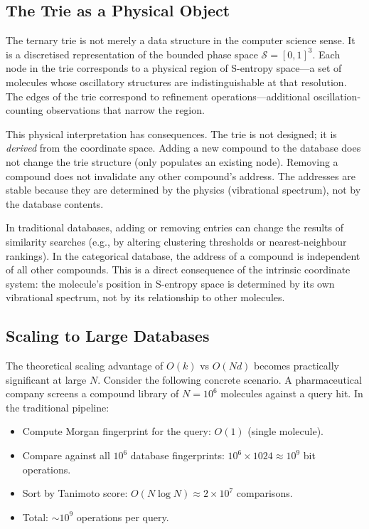 \documentclass[11pt,a4paper]{article}
\theoremstyle{definition}
\theoremstyle{remark}
\newcommand{\Sspace}{\mathcal{S}}
\begin{document}
\subsection{The Trie as a Physical Object}

The ternary trie is not merely a data structure in the computer science sense. It is a discretised representation of the bounded phase space $\Sspace = [0,1]^3$. Each node in the trie corresponds to a physical region of S-entropy space---a set of molecules whose oscillatory structures are indistinguishable at that resolution. The edges of the trie correspond to refinement operations---additional oscillation-counting observations that narrow the region.

This physical interpretation has consequences. The trie is not designed; it is \emph{derived} from the coordinate space. Adding a new compound to the database does not change the trie structure (only populates an existing node). Removing a compound does not invalidate any other compound's address. The addresses are stable because they are determined by the physics (vibrational spectrum), not by the database contents.

In traditional databases, adding or removing entries can change the results of similarity searches (e.g., by altering clustering thresholds or nearest-neighbour rankings). In the categorical database, the address of a compound is independent of all other compounds. This is a direct consequence of the intrinsic coordinate system: the molecule's position in S-entropy space is determined by its own vibrational spectrum, not by its relationship to other molecules.

\subsection{Scaling to Large Databases}

The theoretical scaling advantage of $O(k)$ vs $O(Nd)$ becomes practically significant at large $N$. Consider the following concrete scenario. A pharmaceutical company screens a compound library of $N = 10^6$ molecules against a query hit. In the traditional pipeline:

\begin{itemize}[nosep]
\item Compute Morgan fingerprint for the query: $O(1)$ (single molecule).
\item Compare against all $10^6$ database fingerprints: $10^6 \times 1024 \approx 10^9$ bit operations.
\item Sort by Tanimoto score: $O(N \log N) \approx 2 \times 10^7$ comparisons.
\item Total: $\sim 10^9$ operations per query.
\end{itemize}
\end{document}
